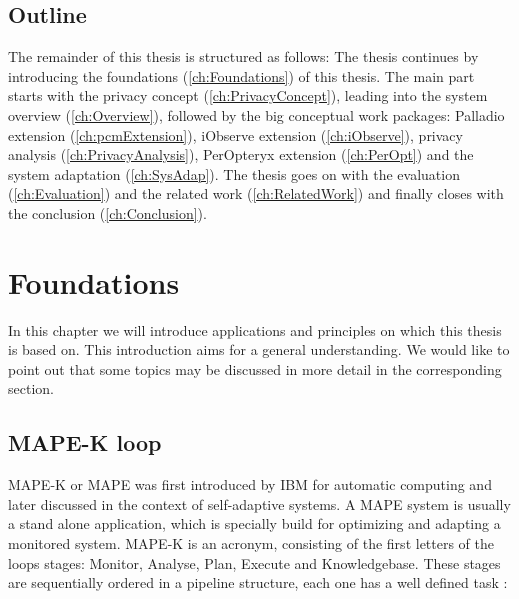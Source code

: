 \section{Outline}
\label{sec:Introduction:outline}

The remainder of this thesis is structured as follows: The thesis continues by introducing the foundations (\autoref{ch:Foundations}) of this thesis. The main part starts with the privacy concept (\autoref{ch:PrivacyConcept}), leading into the system overview (\autoref{ch:Overview}), followed by the big conceptual work packages: Palladio extension (\autoref{ch:pcmExtension}), iObserve extension (\autoref{ch:iObserve}), privacy analysis (\autoref{ch:PrivacyAnalysis}), PerOpteryx extension (\autoref{ch:PerOpt}) and the system adaptation (\autoref{ch:SysAdap}). The thesis goes on with the evaluation (\autoref{ch:Evaluation}) and the related work (\autoref{ch:RelatedWork}) and finally closes with the conclusion (\autoref{ch:Conclusion}).



\chapter{Foundations}
\label{ch:Foundations}

In this chapter we will introduce applications and principles on which this thesis is based on. This introduction aims for a general understanding. We would like to point out that some topics may be discussed in more detail in the corresponding section.

\section{MAPE-K loop}
\label{sec:Foundations:mape}

MAPE-K or MAPE was first introduced by IBM for automatic computing and later discussed in the context of self-adaptive systems. A MAPE system is usually a stand alone application, which is specially build for optimizing and adapting a monitored system. MAPE-K is an acronym, consisting of the first letters of the loops stages: Monitor, Analyse, Plan, Execute and Knowledgebase. These stages are sequentially ordered in a pipeline structure, each one has a well defined task \cite{Dar.2012}:

